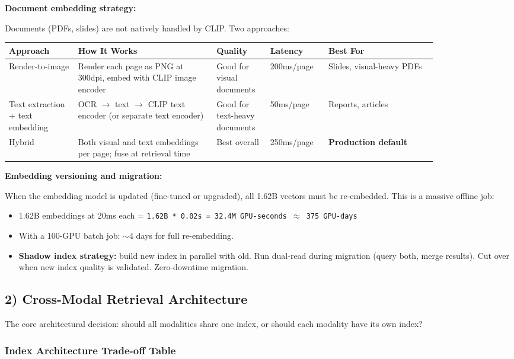 \textbf{Document embedding strategy:}

Documents (PDFs, slides) are not natively handled by CLIP. Two approaches:

\begin{tabular}{|p{0.14\linewidth}|p{0.28\linewidth}|p{0.10\linewidth}|p{0.10\linewidth}|p{0.22\linewidth}|}
\hline
\textbf{Approach} & \textbf{How It Works} & \textbf{Quality} & \textbf{Latency} & \textbf{Best For} \\
\hline
Render-to-image & Render each page as PNG at 300dpi, embed with CLIP image encoder & Good for visual documents & 200ms/page & Slides, visual-heavy PDFs \\
\hline
Text extraction + text embedding & OCR $\rightarrow$ text $\rightarrow$ CLIP text encoder (or separate text encoder) & Good for text-heavy documents & 50ms/page & Reports, articles \\
\hline
Hybrid & Both visual and text embeddings per page; fuse at retrieval time & Best overall & 250ms/page & \textbf{Production default} \\
\hline
\end{tabular}

\textbf{Embedding versioning and migration:}

When the embedding model is updated (fine-tuned or upgraded), all 1.62B vectors must be re-embedded. This is a massive offline job:
\begin{itemize}
  \item 1.62B embeddings at 20ms each = \texttt{1.62B * 0.02s = 32.4M GPU-seconds $\approx$ 375 GPU-days}
  \item With a 100-GPU batch job: $\sim$4 days for full re-embedding.
  \item \textbf{Shadow index strategy:} build new index in parallel with old. Run dual-read during migration (query both, merge results). Cut over when new index quality is validated. Zero-downtime migration.
\end{itemize}

\subsection*{2) Cross-Modal Retrieval Architecture}

The core architectural decision: should all modalities share one index, or should each modality have its own index?

\subsubsection*{Index Architecture Trade-off Table}

